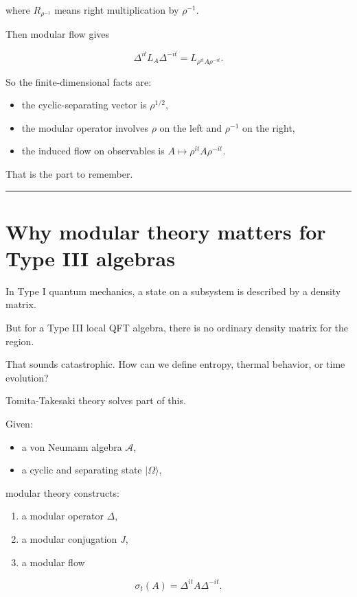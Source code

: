 \documentclass[11pt,a4paper]{article}
\begin{document}
where $R_{\rho^{-1}}$ means right multiplication by $\rho^{-1}$.

Then modular flow gives

\[
\Delta^{it} L_A \Delta^{-it}
=
L_{\rho^{it}A\rho^{-it}}.
\]

So the finite-dimensional facts are:

\begin{itemize}
  \item the cyclic-separating vector is $\rho^{1/2}$,
  \item the modular operator involves $\rho$ on the left and $\rho^{-1}$ on the right,
  \item the induced flow on observables is $A\mapsto \rho^{it}A\rho^{-it}$.
\end{itemize}

That is the part to remember.

\medskip\hrule\medskip

\section{Why modular theory matters for Type III algebras}

In Type I quantum mechanics, a state on a subsystem is described by a density matrix.

But for a Type III local QFT algebra, there is no ordinary density matrix for the region.

That sounds catastrophic. How can we define entropy, thermal behavior, or time evolution?

Tomita-Takesaki theory solves part of this.

Given:

\begin{itemize}
  \item a von Neumann algebra $\mathcal{A}$,
  \item a cyclic and separating state $|\Omega\rangle$,
\end{itemize}

modular theory constructs:

\begin{enumerate}
  \item a modular operator $\Delta$,
  \item a modular conjugation $J$,
  \item a modular flow
\end{enumerate}

\[
\sigma_t(A)=\Delta^{it}A\Delta^{-it}.
\]
\end{document}
